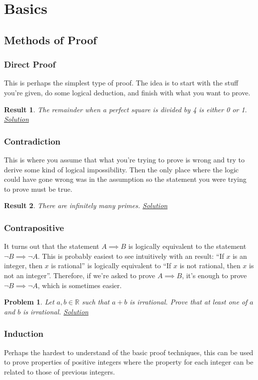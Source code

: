 \documentclass{amsart}
\newtheorem{problem}{Problem}[subsubsection]
\newtheorem{result}{Result}[subsubsection]
\newcommand{\Rr}{\mathbb{R}}
\begin{document}
\section{Basics}
\subsection{Methods of Proof}
\subsubsection{Direct Proof}
This is perhaps the simplest type of proof. The idea is to start with the stuff
you're given, do some logical deduction, and finish with what you want to prove.
\begin{result}\label{r:m:1:1}
  The remainder when a perfect square is divided by 4 is either 0 or 1.
  \hyperlink{s:m:1:1}{Solution}
\end{result}
\subsubsection{Contradiction}
This is where you assume that what you're trying to prove is wrong and try to
derive some kind of logical impossibility. Then the only place where the logic
could have gone wrong was in the assumption so the statement you were trying to
prove must be true.
\begin{result}\label{r:m:2:1}
  There are infinitely many primes.
  \hyperlink{s:m:2:1}{Solution}
\end{result}
\subsubsection{Contrapositive}
It turns out that the statement $A\implies B$ is logically equivalent to the
statement $\neg B\implies\neg A$. This is probably easiest to see intuitively
with an result: ``If $x$ is an integer, then $x$ is rational'' is
logically equivalent to ``If $x$ is not rational, then $x$ is not an integer''.
Therefore, if we're asked to prove $A\implies B$, it's enough to
prove $\neg B\implies\neg A$, which is sometimes easier.
\begin{problem}\label{p:m:3:1}
  Let $a,b\in\Rr$ such that $a+b$ is irrational. Prove that at least one of $a$
  and $b$ is irrational.
  \hyperlink{s:m:3:1}{Solution}
\end{problem}
\subsubsection{Induction}
Perhaps the hardest to understand of the basic proof techniques, this can be
used to prove properties of positive integers where the property for each
integer can be related to those of previous integers.
\end{document}

